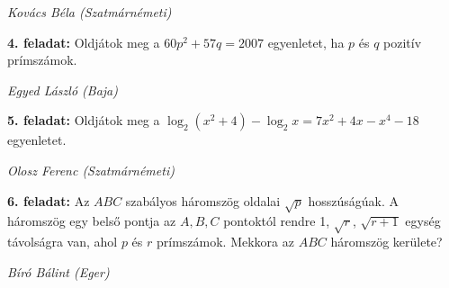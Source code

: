 \documentclass[a4paper,10pt]{article}
\def\ki#1#2{\hfill {\it #1 (#2)}\medskip}
\begin{document}
\ki{Kovács Béla}{Szatmárnémeti}\medskip

{\bf 4. feladat: } Oldjátok meg a $60p^2+57q=2007$ egyenletet, ha $p$ és $q$ pozitív prímszámok.

\ki{Egyed László}{Baja}\medskip

{\bf 5. feladat: }  Oldjátok meg a  
$\log_2\left(x^2+4\right)-\log_2 x=7x^2+4x-x^4-18$
egyenletet.

\ki{Olosz Ferenc}{Szatmárnémeti}\medskip

{\bf 6. feladat: } Az  $ABC$ szabályos háromszög oldalai $\sqrt{p}$ hosszúságúak. A háromszög egy  belső pontja az $A, B,C$ pontoktól rendre 1, $\sqrt{r}$, $\sqrt{r+1}$ egység távolságra van, ahol  $p$ és $r$  prímszámok. Mekkora az $ABC$ háromszög kerülete?

\ki{Bíró Bálint}{Eger}\medskip

\vfill
\end{document}
